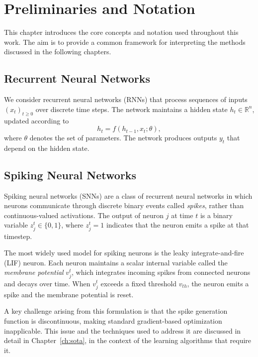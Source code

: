\chapter{Preliminaries and Notation}
\label{ch:preliminaries}

This chapter introduces the core concepts and notation used throughout this work.
The aim is to provide a common framework for interpreting the methods discussed
in the following chapters.

\section{Recurrent Neural Networks}

We consider recurrent neural networks (RNNs) that process sequences of inputs
$(x_t)_{t \geq 0}$ over discrete time steps. The network maintains a hidden
state $h_t \in \mathbb{R}^n$, updated according to
\begin{equation}
    h_t = f(h_{t-1}, x_t; \theta),
\end{equation}
where $\theta$ denotes the set of parameters. The network produces outputs
$y_t$ that depend on the hidden state.

\section{Spiking Neural Networks}

Spiking neural networks (SNNs) are a class of recurrent neural networks in
which neurons communicate through discrete binary events called \emph{spikes},
rather than continuous-valued activations. The output of neuron $j$ at time
$t$ is a binary variable $z^t_j \in \{0, 1\}$, where $z^t_j = 1$ indicates
that the neuron emits a spike at that timestep.

The most widely used model for spiking neurons is the leaky integrate-and-fire
(LIF) neuron. Each neuron maintains a scalar internal variable called the
\emph{membrane potential} $v^t_j$, which integrates incoming spikes from
connected neurons and decays over time. When $v^t_j$ exceeds a fixed threshold
$v_{th}$, the neuron emits a spike and the membrane potential is reset.

A key challenge arising from this formulation is that the spike generation
function is discontinuous, making standard gradient-based
optimization inapplicable. This issue and the techniques used to address it
are discussed in detail in Chapter~\ref{ch:sota}, in the context of the
learning algorithms that require it.

